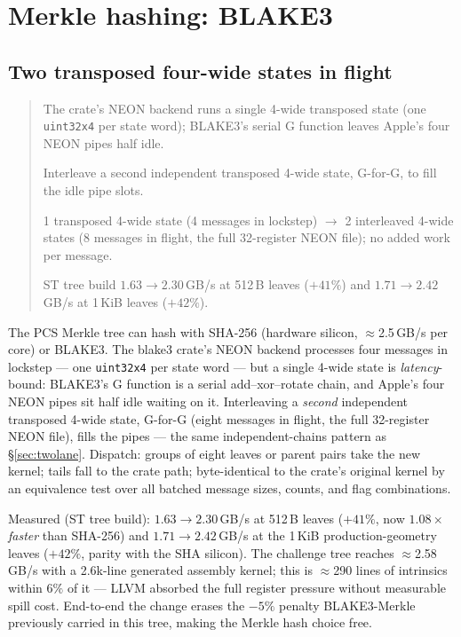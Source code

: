 \documentclass[11pt]{article}
\newcommand{\code}[1]{\texttt{#1}}
\newenvironment{optsummary}{%
  \begin{quote}\small
  \begin{description}
  \setlength{\itemsep}{1pt}\setlength{\parsep}{0pt}\setlength{\topsep}{2pt}
}{%
  \end{description}
  \end{quote}
}
\begin{document}
\section{Merkle hashing: BLAKE3}

\subsection{Two transposed four-wide states in flight}
\label{sec:blake3neon}

\begin{optsummary}
\item[Baseline:] The crate's NEON backend runs a single 4-wide transposed state (one \code{uint32x4} per state word); BLAKE3's serial G function leaves Apple's four NEON pipes half idle.
\item[Improvement:] Interleave a second independent transposed 4-wide state, G-for-G, to fill the idle pipe slots.
\item[Mechanism:] 1 transposed 4-wide state (4 messages in lockstep) $\to$ 2 interleaved 4-wide states (8 messages in flight, the full 32-register NEON file); no added work per message.
\item[Result:] ST tree build $1.63\to2.30\,$GB/s at 512\,B leaves ($+41\%$) and $1.71\to2.42\,$GB/s at 1\,KiB leaves ($+42\%$).
\end{optsummary}

The PCS Merkle tree can hash with SHA-256 (hardware silicon, $\approx$2.5\,GB/s
per core) or BLAKE3. The blake3 crate's NEON backend processes four messages
in lockstep --- one \code{uint32x4} per state word --- but a single 4-wide
state is \emph{latency}-bound: BLAKE3's G function is a serial
add--xor--rotate chain, and Apple's four NEON pipes sit half idle waiting on
it. Interleaving a \emph{second} independent transposed 4-wide state, G-for-G
(eight messages in flight, the full 32-register NEON file), fills the pipes
--- the same independent-chains pattern as \S\ref{sec:twolane}. Dispatch:
groups of eight leaves or parent pairs take the new kernel; tails fall to the
crate path; byte-identical to the crate's original kernel by an equivalence
test over all batched message sizes, counts, and flag combinations.

Measured (ST tree build): $1.63 \to 2.30$\,GB/s at 512\,B leaves ($+41\%$,
now $1.08\times$ \emph{faster} than SHA-256) and $1.71 \to 2.42$\,GB/s at the
1\,KiB production-geometry leaves ($+42\%$, parity with the SHA silicon). The
challenge tree reaches $\approx$2.58\,GB/s with a 2.6k-line generated
assembly kernel; this is $\approx$290 lines of intrinsics within $6\%$ of it
--- LLVM absorbed the full register pressure without measurable spill cost.
End-to-end the change erases the $-5\%$ penalty BLAKE3-Merkle previously
carried in this tree, making the Merkle hash choice free.
\end{document}
